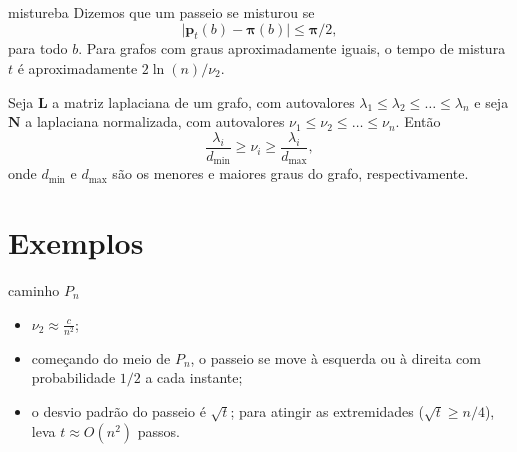 \documentclass{beamer}
\begin{document}
\begin{frame}{mistureba}
    Dizemos que um passeio se \alert{misturou} se
    \begin{equation*}
        \vert \mathbf{p}_t(b) - \mathbf{\pi}(b) \vert \leq \mathbf{\pi}/2,
    \end{equation*} para todo \(b\).
    Para grafos com graus aproximadamente iguais, o \alert{tempo de mistura} \(t\) é aproximadamente \(2 \ln(n)/\nu_2\). \pause

    \begin{lem}
        Seja \(\mathbf{L}\) a \alert{matriz laplaciana} de um grafo, com autovalores \(\lambda_1 \leq \lambda_2 \leq \ldots \leq \lambda_n\) e seja \(\mathbf{N}\) a laplaciana normalizada, com autovalores \(\nu_1 \leq \nu_2 \leq \ldots \leq \nu_n\). Então
        \begin{equation*}
            \frac{\lambda_i}{d_{\min}} \geq \nu_i \geq \frac{\lambda_i}{d_{\max}},
        \end{equation*} onde \(d_{\min}\) e \(d_{\max}\) são os menores e maiores graus do grafo, respectivamente.
    \end{lem}
\end{frame}

\section{Exemplos}

\begin{frame}{caminho \(P_n\)}
    \centering
    \begin{itemize}
        \item \(\nu_2 \approx \frac{c}{n^2}\);
        \item começando do meio de \(P_n\), o passeio se move à esquerda ou à direita com probabilidade \(1/2\) a cada instante;
        \item o desvio padrão do passeio é \(\sqrt{t}\); para atingir as extremidades (\(\sqrt{t} \geq n/4\)), leva \(t \approx O(n^2)\) passos.
    \end{itemize}
\end{frame}
\end{document}
